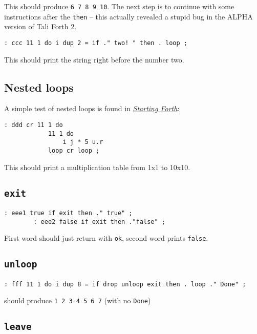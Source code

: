 \noindent This should produce \texttt{6 7 8 9 10}. The next step is to continue
with some instructions after the \texttt{then} -- this actually revealed a
stupid bug in the ALPHA version of Tali Forth 2.

\begin{lstlisting}[frame=lines]
        : ccc 11 1 do i dup 2 = if ." two! " then . loop ;
\end{lstlisting}

\noindent This should print the string right before the number two.


\subsection{Nested loops}

\noindent A simple test of nested loops is found in
\href{https://www.forth.com/starting-forth/6-forth-do-loops/}{\textit{Starting
Forth}}:

\begin{lstlisting}[frame=lines]
        : ddd cr 11 1 do
            11 1 do 
                i j * 5 u.r 
            loop cr loop ;
\end{lstlisting}

\noindent This should print a multiplication table from 1x1 to 10x10.

\subsection{\texttt{exit}}

\begin{lstlisting}[frame=lines]
        : eee1 true if exit then ." true" ; 
        : eee2 false if exit then ."false" ; 
\end{lstlisting}

\noindent First word should just return with \texttt{ok}, second word prints \texttt{false}.


\subsection{\texttt{unloop}}

\begin{lstlisting}[frame=lines]
        : fff 11 1 do i dup 8 = if drop unloop exit then . loop ." Done" ; 
\end{lstlisting}

\noindent should produce \texttt{1 2 3 4 5 6 7} (with no \texttt{Done})


\subsection{\texttt{leave}}

